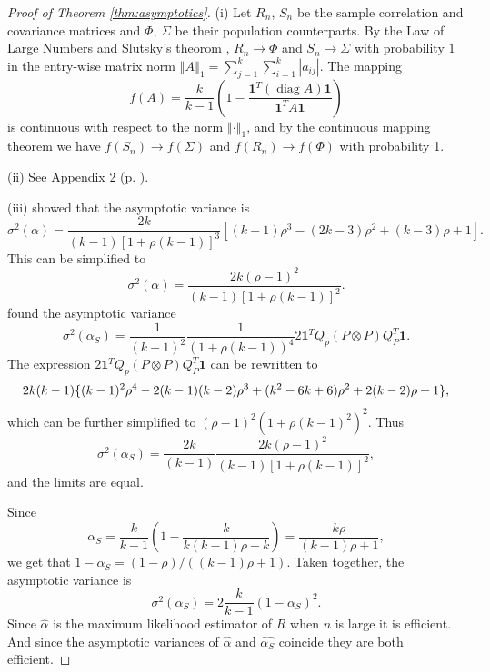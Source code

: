 \documentclass[twoside]{article}
\DeclareMathOperator{\diag}{diag}
\DeclareMathOperator{\tsum}{\textstyle \sum}
\begin{document}
\begin{proof}[Proof of Theorem \ref{thm:asymptotics}]\label{proof:asymptotics}
(i) Let $R_{n}$, $S_{n}$ be the sample correlation and covariance matrices
and $\Phi$, $\Sigma$ be their population counterparts. By the Law
of Large Numbers and Slutsky's theorom \citep[][Lemma 2.8, p. 11]{Van_der_Vaart2000-qc}, $R_{n}\to\Phi$ and $S_{n}\to\Sigma$
with probability $1$ in the entry-wise matrix norm $\left\Vert A\right\Vert _{1}=\tsum_{j=1}^{k}\tsum_{i=1}^{k}\left|a_{ij}\right|$.
The mapping
\[
f(A)=\frac{k}{k-1}\left(1-\frac{\boldsymbol{1}^{T}(\diag A)\boldsymbol{1}}{\boldsymbol{1}^{T}A\boldsymbol{1}}\right)
\]
is continuous with respect to the norm $\left\Vert \cdot\right\Vert _{1}$,
and by the continuous mapping theorem \citep[][Theorem 2.3, p. 7]{Van_der_Vaart2000-qc} we have
$f(S_{n})\to f(\Sigma)$ and $f(R_{n})\to f(\Phi)$
with probability 1.

(ii) See Appendix 2 (p. \pageref{Appendix 2}).

(iii) \citet[eq. 22]{Van_Zyl2000-si} showed that the asymptotic variance
is
\[
\sigma^{2}(\alpha)=\frac{2k}{(k-1)[1+\rho(k-1)]^{3}}[(k-1)\rho^{3}-(2k-3)\rho^{2}+(k-3)\rho+1].
\]
This can be simplified to
\[
\sigma^{2}(\alpha)=\frac{2k(\rho-1)^{2}}{(k-1)[1+\rho(k-1)]^{2}}.
\]
\citet[equation 10]{hayashi2005note} found the asymptotic variance
\[
\sigma^{2}(\alpha_S)=\frac{1}{(k-1)^{2}}\frac{1}{(1+\rho(k-1))^{4}}2\boldsymbol{1}^{T}Q_{p}(P\otimes P)Q_{P}^{T}\boldsymbol{1}.
\]
The expression $2\boldsymbol{1}^{T}Q_{p}(P\otimes P)Q_{P}^{T}\boldsymbol{1}$
can be rewritten to \citep[Appendix 3]{hayashi2005note}
\[
2k(k-1)\{ (k-1)^{2}\rho^{4}-2(k-1)(k-2)\rho^{3}+(k^{2}-6k+6)\text{\ensuremath{\rho^{2}+2(k-2)\rho+1}}\},
\]
which can be further simplified to $(\rho-1)^{2}(1+\rho(k-1)^{2})^{2}$.
Thus
\[
\sigma^{2}(\alpha_S)=\frac{2k}{(k-1)}\frac{2k(\rho-1)^{2}}{(k-1)[1+\rho(k-1)]^{2}},
\]
and the limits are equal.

Since
\begin{equation*}
\alpha_S = \frac{k}{k-1}\left(1-\frac{k}{k(k-1)\rho+k}\right) = \frac{k\rho}{(k-1)\rho+1},
\end{equation*}
we get that $1-\alpha_S = (1-\rho)/((k-1)\rho+1)$. Taken together, the asymptotic variance is
\[
\sigma^{2}(\alpha_S)=2\frac{k}{k-1}(1-\alpha_S)^{2}.
\]
Since $\hat{\alpha}$ is the maximum likelihood estimator of $ R$
when $n$ is large it is efficient. And since the asymptotic variances
of $\hat{\alpha}$ and $\hat{\alpha_S}$ coincide they
are both efficient.
\end{proof}
\end{document}
